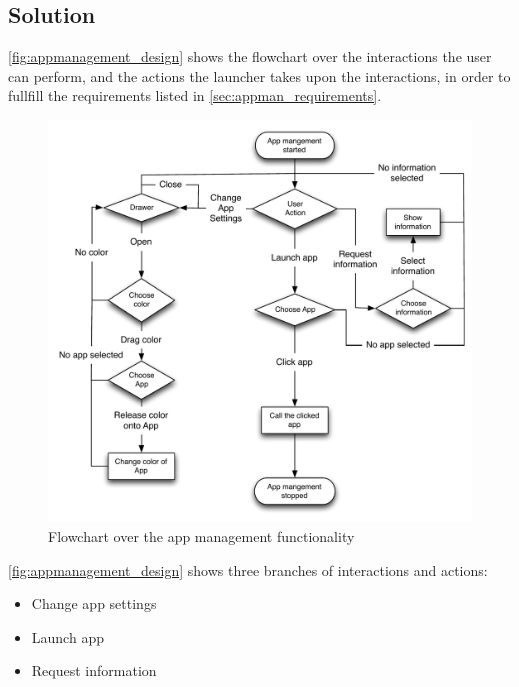 
\subsection{Solution}
\label{sec:appman_solution}

\autoref{fig:appmanagement_design} shows the flowchart over the interactions the user can perform, and the actions the launcher takes upon the interactions, in order to fullfill the requirements listed in \autoref{sec:appman_requirements}.

\begin{figure}[h]
	\centering
	\includegraphics[width=1\textwidth]{gfx/appmanagement.pdf}
	\caption{Flowchart over the app management functionality}
	\label{fig:appmanagement_design}
\end{figure}

\autoref{fig:appmanagement_design} shows three branches of interactions and actions:

\begin{itemize}
	\item Change app settings
	\item Launch app
	\item Request information
\end{itemize}


